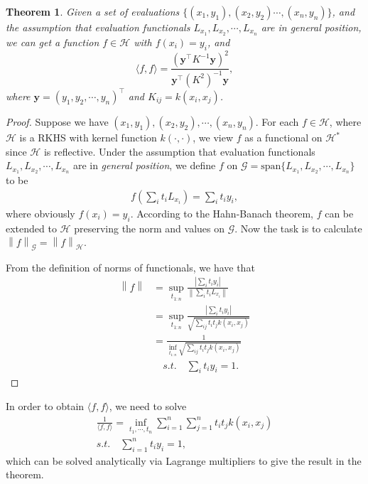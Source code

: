 \documentclass[a4paper]{article}
\newcommand{\up}{\mathrm}
\renewcommand{\bf}{\mathbf}
\renewcommand{\cal}{\mathcal}
\newcommand{\norm}[1]{\left\lVert#1\right\rVert}
\newcommand{\T}{\intercal}
\newtheorem{theorem}{Theorem}
\begin{document}
\begin{theorem}
Given a set of evaluations $\{(x_1,y_1),(x_2,y_2)\cdots,(x_n,y_n)\}$, and the assumption that evaluation functionals $L_{x_1},L_{x_2},\cdots,L_{x_n}$ are in general position, we can get a function $f \in \cal{H}$ with $f(x_i) = y_i$, and 
\begin{equation}
\langle f,f\rangle = \frac{(\bf{y}^\T K^{-1} \bf{y})^2}{\bf{y}^\T (K^2)^{-1}\bf{y}},
\end{equation}
where $\bf{y} = (y_1,y_2,\cdots,y_n)^\T$ and $K_{ij} = k(x_i,x_j)$.
\end{theorem}
\begin{proof}
Suppose we have $(x_1,y_1),(x_2,y_2),\cdots,(x_n,y_n)$. For each $f \in \cal{H}$, where $\cal{H}$ is a RKHS with kernel function $k(\cdot,\cdot)$, we view $f$ as a functional on $\cal{H}^*$ since $\cal{H}$ is reflective. Under the assumption that evaluation functionals $L_{x_1},L_{x_2},\cdots,L_{x_n}$ are in \textit{general position}, we define $f$ on $\cal{G} = \up{span} \{L_{x_1},L_{x_2},\cdots,L_{x_n}\}$ to be 
\begin{align}
f(\sum_i t_i L_{x_i}) = \sum_i t_i y_i,
\end{align}
where obviously $f(x_i) = y_i$. According to the Hahn-Banach theorem, $f$ can be extended to $\cal{H}$ preserving the norm and values on $\cal{G}$. Now the task is to calculate $\norm{f}_{\cal{G}} = \norm{f}_{\cal{H}}$.

From the definition of norms of functionals, we have that
\begin{align}
\norm{f} &= \sup_{t_{1:n}} \frac{|\sum_i t_i y_i|}{\norm{\sum_i t_i L_{x_i}}}\\
&= \sup_{t_{1:n}} \frac{|\sum_i t_i y_i|}{\sqrt{\sum_{ij} t_i t_j k(x_i,x_j)}}\\
&= \frac{1}{\inf_{t_{1:n}} \sqrt{\sum_{ij} t_i t_j k(x_i,x_j)}}\\
& \quad s.t. \quad \sum_i t_i y_i = 1.
\end{align}
\end{proof}
In order to obtain $\langle f,f\rangle$, we need to solve
\begin{gather*}
\frac{1}{\langle f,f\rangle} = \inf_{t_1,\cdots,t_n} \sum_{i=1}^n\sum_{j=1}^n t_it_j k(x_i,x_j)\\
s.t.\quad \sum_{i=1}^n t_i y_i = 1,
\end{gather*}
which can be solved analytically via Lagrange multipliers to give the result in the theorem.
\end{document}
